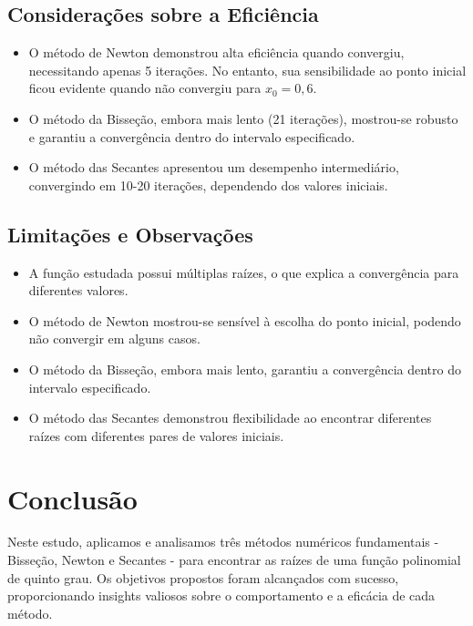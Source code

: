 \documentclass{article}
\begin{document}
\subsection{Considera\c{c}\~{o}es sobre a Efici\^{e}ncia}
\begin{itemize}
    \item O m\'{e}todo de Newton demonstrou alta efici\^{e}ncia quando convergiu, necessitando apenas 5 itera\c{c}\~{o}es. No entanto, sua sensibilidade ao ponto inicial ficou evidente quando n\~{a}o convergiu para $x_0 = 0,6$.
    \item O m\'{e}todo da Bisse\c{c}\~{a}o, embora mais lento (21 itera\c{c}\~{o}es), mostrou-se robusto e garantiu a converg\^{e}ncia dentro do intervalo especificado.
    \item O m\'{e}todo das Secantes apresentou um desempenho intermedi\'{a}rio, convergindo em 10-20 itera\c{c}\~{o}es, dependendo dos valores iniciais.
\end{itemize}

\subsection{Limita\c{c}\~{o}es e Observa\c{c}\~{o}es}
\begin{itemize}
    \item A fun\c{c}\~{a}o estudada possui m\'{u}ltiplas ra\'{i}zes, o que explica a converg\^{e}ncia para diferentes valores.
    \item O m\'{e}todo de Newton mostrou-se sens\'{i}vel \`{a} escolha do ponto inicial, podendo n\~{a}o convergir em alguns casos.
    \item O m\'{e}todo da Bisse\c{c}\~{a}o, embora mais lento, garantiu a converg\^{e}ncia dentro do intervalo especificado.
    \item O m\'{e}todo das Secantes demonstrou flexibilidade ao encontrar diferentes ra\'{i}zes com diferentes pares de valores iniciais.
\end{itemize}




\section{Conclusão}
Neste estudo, aplicamos e analisamos três métodos numéricos fundamentais - Bisseção, Newton e Secantes - para encontrar as raízes de uma função polinomial de quinto grau. Os objetivos propostos foram alcançados com sucesso, proporcionando insights valiosos sobre o comportamento e a eficácia de cada método.
\end{document}
